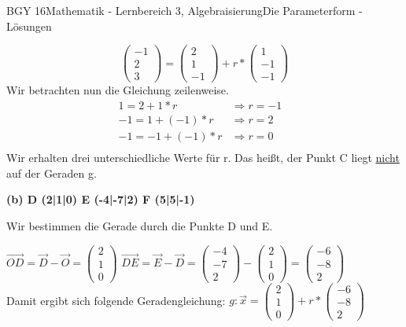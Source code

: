 \documentclass[oneside,openany,headings=optiontotoc,11pt,numbers=noenddot]{scrreprt}
\begin{document}
\begin{worksheet}{BGY 16}{Mathematik - Lernbereich 3, Algebraisierung}{Die Parameterform - Lösungen}
\begin{framed}
			\[\left(\begin{array}{c}-1\\2\\3\end{array}\right) = \left(\begin{array}{c}2 \\ 1 \\ -1\end{array}\right) + r*\left(\begin{array}{c}1\\-1\\-1\end{array}\right)\]
			Wir betrachten nun die Gleichung zeilenweise.
			\[\begin{array}{llc}
			1 = 2 + 1*r & \Rightarrow r = -1&\\
			-1 = 1 + (-1)*r & \Rightarrow r = 2&\\
			-1 = -1 + (-1)*r & \Rightarrow r = 0\\
			\end{array}\]
			Wir erhalten drei unterschiedliche Werte für r. Das heißt, der Punkt C liegt \underline{nicht} auf der Geraden g.
			\par
			\textbf{(b) D (2|1|0) E (-4|-7|2) F (5|5|-1)}\\
			\par\noindent
			Wir bestimmen die Gerade durch die Punkte D und E.\\
			\par\noindent
			\(\overrightarrow{OD} = \vec{D} -\vec{O} = \left(\begin{array}{c}2\\1\\0\end{array}\right)\) \(\overrightarrow{DE} = \vec{E} -\vec{D} = \left(\begin{array}{c}-4\\-7\\2\end{array}\right) - \left(\begin{array}{c}2\\1\\0\end{array}\right) = \left(\begin{array}{c}-6\\-8\\2\end{array}\right)\)\\
			Damit ergibt sich folgende Geradengleichung: \(g: \vec{x} = \left(\begin{array}{c}2 \\ 1 \\ 0\end{array}\right) + r*\left(\begin{array}{c}-6\\-8\\2\end{array}\right)\)\\

\end{framed}
\end{worksheet}
\end{document}
